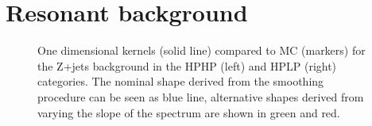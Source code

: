 \section{Resonant background}
\label{app:search3:resbkg}
\begin{figure}[h!]
\centering
{}
\caption{One dimensional \MVV kernels (solid line) compared to MC (markers) for the Z+jets background in the HPHP (left) and HPLP (right) categories. The nominal shape derived from the smoothing procedure can be seen as blue line, alternative shapes derived from varying the slope of the \MVV spectrum are shown in green and red.}
\label{fig:app:Zjets_mvv}
\end{figure}

